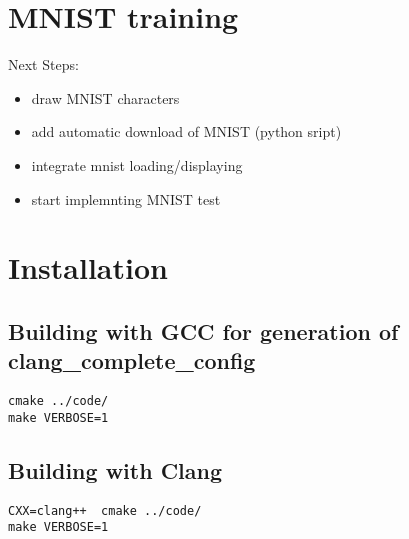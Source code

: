 \documentclass[a4paper,10pt]{article}
\begin{document}
\section{MNIST training}
Next Steps:
\begin{itemize}
\item draw MNIST characters
\item add automatic download of MNIST (python sript)
\item integrate mnist loading/displaying
\item start implemnting MNIST test 
\end{itemize}

\section{Installation}
\subsection{Building with GCC for generation of clang\_complete\_config}
\begin{verbatim}
cmake ../code/
make VERBOSE=1
\end{verbatim}
\subsection{Building with Clang}
\begin{verbatim}
CXX=clang++  cmake ../code/
make VERBOSE=1
\end{verbatim}
\end{document}
